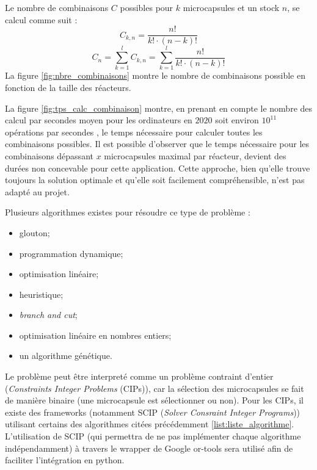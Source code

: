 Le nombre de combinaisons $C$ possibles pour $k$ microcapsules et un stock $n$, se calcul comme suit :
\begin{equation}
    C_{k,n} = \frac{n!}{k!\cdot(n-k)!}
    \label{eq:combinaison}
\end{equation}
\begin{equation}
    C_{n} = \sum_{k = 1}^{l} C_{k,n} = \sum_{k=1}^{l}\frac{n!}{k!\cdot (n-k)!}
    \label{eq:nbre_combinaisons}
\end{equation} 
La figure \autoref{fig:nbre_combinaisons} montre le nombre de combinaisons possible en fonction de la taille des réacteurs. 

La figure \autoref{fig:tps_calc_combinaison} montre, en prenant en compte le nombre des calcul par secondes moyen pour les ordinateurs en $2020$ soit environ $10^{11}$ opérations par secondes \cite{petite_analyse_nbre_calculs_par_sec}, le temps nécessaire pour calculer toutes les combinaisons possibles. Il est possible d'observer que le temps nécessaire pour les combinaisons dépassant $x$ microcapsules maximal par réacteur, devient des durées non concevable pour cette application.
Cette approche, bien qu'elle trouve toujours la solution optimale et qu'elle soit facilement compréhensible, n'est pas adapté au projet.

Plusieurs algorithmes existes pour résoudre ce type de problème : 
\begin{itemize}
    \item glouton;
    \item programmation dynamique;
    \item optimisation linéaire;
    \item heuristique;
    \item \textit{branch and cut};
    \item optimisation linéaire en nombres entiers;
    \item un algorithme génétique.
    \label{list:liste_algorithme}
\end{itemize}

Le problème peut être interpreté comme un problème contraint d'entier (\textit{Constraints Integer Problems} (CIPs)), car la sélection des microcapsules se fait de manière binaire (une microcapsule est sélectionner ou non). Pour les CIPs, il existe des frameworks (notamment SCIP (\textit{Solver Consraint Integer Programs})) utilisant certains des algorithmes citées précédemment \autoref{list:liste_algorithme}. L'utilisation de SCIP (qui permettra de ne pas implémenter chaque algorithme indépendamment) à travers le wrapper de Google or-tools sera utilisé afin de faciliter l'intégration en python. 

